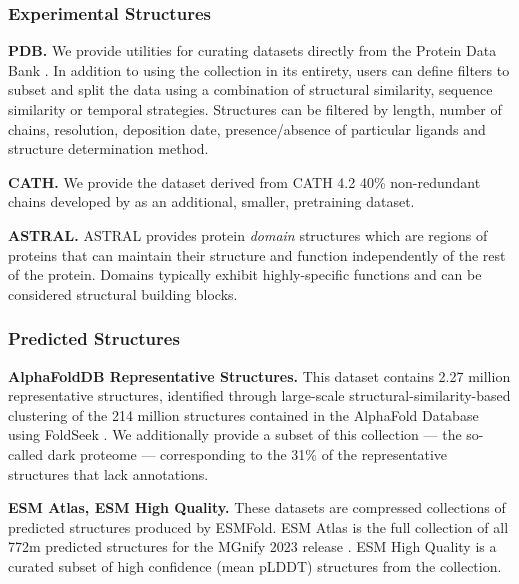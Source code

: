 \subsubsection{Experimental Structures}

\textbf{PDB. } We provide utilities for curating datasets directly from the Protein Data Bank \citep{Berman2000}. In addition to using the collection in its entirety, users can define filters to subset and split the data using a combination of structural similarity, sequence similarity or temporal strategies. Structures can be filtered by length, number of chains, resolution, deposition date, presence/absence of particular ligands and structure determination method. 

\textbf{CATH. } We provide the dataset derived from CATH 4.2 40\% \citep{Knudsen2010} non-redundant chains developed by \citet{NEURIPS2019_f3a4ff48} as an additional, smaller, pretraining dataset. 

\textbf{ASTRAL. } ASTRAL \citep{Brenner2000} provides protein \emph{domain} structures which are regions of proteins that can maintain their structure and function independently of the rest of the protein. Domains typically exhibit highly-specific functions and can be considered structural building blocks.

\subsubsection{Predicted Structures}

\textbf{AlphaFoldDB Representative Structures.} This dataset contains 2.27 million representative structures, identified through large-scale structural-similarity-based clustering of the 214 million structures contained in the AlphaFold Database \citep{Varadi2021} using FoldSeek \citep{vanKempen2023}. We additionally provide a subset of this collection --- the so-called dark proteome --- corresponding to the 31\% of the representative structures that lack annotations.

\textbf{ESM Atlas, ESM High Quality.} These datasets are compressed collections of predicted structures produced by ESMFold. ESM Atlas is the full collection of all 772m predicted structures for the MGnify 2023 release \citep{Richardson2022}. ESM High Quality is a curated subset of high confidence (mean pLDDT) structures from the collection.

